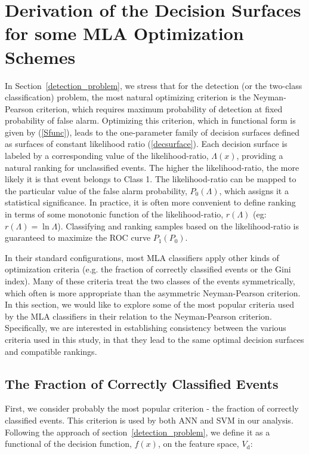 \documentclass[prd, twocolumn, lengthcheck, superscriptaddress, showpacs, letterpaper, nofootinbib]{revtex4-1}
\newcommand\auxvec{x}
\newcommand\Vdata{V_\mathrm{d}}
\begin{document}
\appendix 
\section{Derivation of the Decision Surfaces for some MLA Optimization Schemes}%
\label{appendix:fom}

In Section~\ref{detection_problem}, we stress that for the detection (or the two-class classification) problem, the most natural optimizing criterion is the Neyman-Pearson criterion, which requires maximum probability of detection at fixed probability of false alarm. Optimizing this criterion, which in functional form is given by (\ref{Sfunc}), leads to the one-parameter family of decision surfaces defined as surfaces of constant likelihood ratio (\ref{decsurface}). Each decision surface is labeled by a corresponding value of the likelihood-ratio, $\Lambda(\auxvec)$, providing a natural ranking for unclassified events. The higher the likelihood-ratio, the more likely it is that event belongs to Class 1. The likelihood-ratio can be mapped to the particular value of the false alarm probability, $P_{0}(\Lambda)$, which assigns it a statistical significance. In practice, it is often more convenient to define ranking in terms of some monotonic function of the likelihood-ratio, $r(\Lambda)$ (eg: $r(\Lambda) = \ln \Lambda$). Classifying and ranking samples based on the likelihood-ratio is guaranteed to maximize the \ac{ROC} curve $P_{1}(P_{0})$. 

In their standard configurations, most \ac{MLA} classifiers apply other kinds of optimization criteria (e.g. the fraction of correctly classified events or the Gini index). Many of these criteria treat the two classes of the events symmetrically, which often is more appropriate than the asymmetric Neyman-Pearson criterion. In this section, we would like to explore some of the most popular criteria used by the \ac{MLA} classifiers in their relation to the Neyman-Pearson criterion. Specifically, we are interested in establishing consistency between the various criteria used in this study, in that they lead to the same optimal decision surfaces and compatible rankings.      

\subsection{The Fraction of Correctly Classified Events}
First, we consider probably the most popular criterion - the fraction of correctly classified events. This criterion is used by both \ac{ANN} and \ac{SVM} in our analysis. Following the approach of section~\ref{detection_problem}, we define it as a functional of the decision function, $f(\auxvec)$, on the feature space, $\Vdata$:
\end{document}
